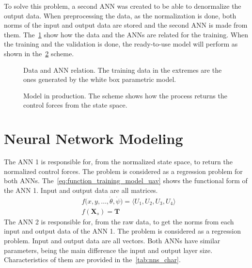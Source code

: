 To solve this problem, a second ANN was created to be able to denormalize the output data.
When preprocessing the data, as the normalization is done, both norms of the input and output data are stored and the second ANN is made from them.
The~\cref{fig:nns_scheme} show how the data and the ANNs are related for the training. 
When the training and the validation is done, the ready-to-use model will perform as shown in the~\cref{fig:full_scheme} scheme.

\begin{figure}[!htb]
    \centering
    \caption[Data and ANN relation]{Data and ANN relation. The training data in the extremes are the ones generated by the white box parametric model.}
    

    \label{fig:nns_scheme}
\end{figure}

\begin{figure}[!htb]
    \centering
    \caption[Model in Production]{Model in production. The scheme shows how the process returns the control forces from the state space.}
    

    \label{fig:full_scheme}
\end{figure}

\section{Neural Network Modeling}

The ANN 1 is responsible for, from the normalized state space, to return the normalized control forces.
The problem is considered as a regression problem for both ANNs.
The~\cref{eq:function_training_model_uav} shows the functional form of the ANN 1. Input and output data are all matrices.
%
\begin{subequations}\label{eq:function_training_model_uav}
    \begin{align}
        &f\big(x,y,\ldots,\dot{\theta},\dot{\psi}\big) = \langle U_1, U_2, U_3, U_4 \rangle \\
        &f(\mathbf{X}_s) = \mathbf{T}
    \end{align}
\end{subequations}
%
The  ANN 2 is responsible for, from the raw data, to get the norms from each input and output data of the ANN 1.
The problem is considered as a regression problem.
Input and output data are all vectors.
Both ANNs have similar parameters, being the main difference the input and output layer size.
Characteristics of them are provided in the~\cref{tab:nns_char}.

